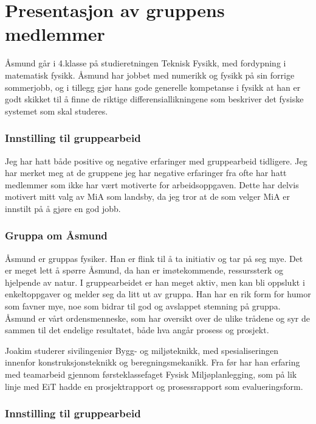 \chapter{Presentasjon av gruppens medlemmer}
Åsmund går i 4.klasse på studieretningen Teknisk Fysikk, med fordypning 
i matematisk fysikk. Åsmund har jobbet med numerikk og fysikk på sin forrige 
sommerjobb, og i tillegg gjør hans gode generelle kompetanse i fysikk at han 
er godt skikket til å finne de riktige differensiallikningene som beskriver
det fysiske systemet som skal studeres.

\subsection*{Innstilling til gruppearbeid}
Jeg har hatt både positive og negative erfaringer med gruppearbeid tidligere.
Jeg har merket meg at de gruppene jeg har negative erfaringer fra ofte har hatt
medlemmer som ikke har vært motiverte for arbeidsoppgaven. Dette har delvis
motivert mitt valg av MiA som landsby, da jeg tror at de som velger MiA er
innstilt på å gjøre en god jobb.

\subsection*{Gruppa om Åsmund}

Åsmund er gruppas fysiker. Han er flink til å ta initiativ og tar på seg mye.
Det er meget lett å spørre Åsmund, da han er imøtekommende, ressurssterk og
hjelpende av natur. I gruppearbeidet er han meget aktiv, men kan bli oppslukt i enkeltoppgaver og
melder seg da litt ut av gruppa. Han har en rik form for humor som favner
mye, noe som bidrar til god og avslappet stemning på gruppa. Åsmund er vårt
ordensmenneske, som har oversikt over de ulike trådene og syr de sammen til det
endelige resultatet, både hva angår prosess og prosjekt.

Joakim studerer sivilingeniør Bygg- og miljøteknikk, med
spesialiseringen innenfor konstruksjonsteknikk og beregningsmekanikk. Fra før
har han erfaring med teamarbeid gjennom førsteklassefaget Fysisk
Miljøplanlegging, som på lik linje med EiT hadde en prosjektrapport og
prosessrapport som evalueringsform.

\subsection*{Innstilling til gruppearbeid}

